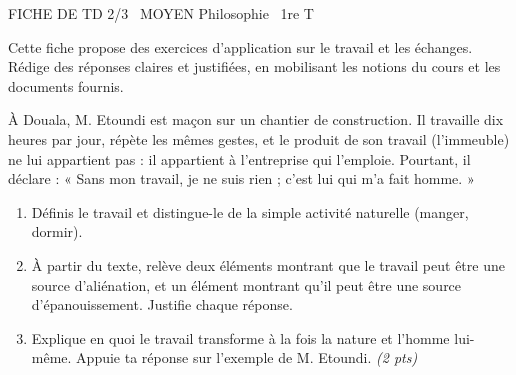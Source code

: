 \documentclass[11pt]{article}
\begin{document}
\begin{tcolorbox}[enhanced,colback=popink,colframe=popink,arc=10pt,boxrule=0pt,left=12pt,right=12pt,top=9pt,bottom=9pt]
{\color{white}\popxbold\small FICHE DE TD 2/3 \textbullet\ MOYEN \hfill Philosophie \textbullet\ 1re T\par}
\end{tcolorbox}
\vspace{4pt}
Cette fiche propose des exercices d'application sur le travail et les échanges. Rédige des réponses claires et justifiées, en mobilisant les notions du cours et les documents fournis.

\begin{exercice}
À Douala, M. Etoundi est maçon sur un chantier de construction. Il travaille dix heures par jour, répète les mêmes gestes, et le produit de son travail (l'immeuble) ne lui appartient pas : il appartient à l'entreprise qui l'emploie. Pourtant, il déclare : « Sans mon travail, je ne suis rien ; c'est lui qui m'a fait homme. »
\begin{enumerate}
\item Définis le travail et distingue-le de la simple activité naturelle (manger, dormir).
\item À partir du texte, relève deux éléments montrant que le travail peut être une source d'aliénation, et un élément montrant qu'il peut être une source d'épanouissement. Justifie chaque réponse.
\item Explique en quoi le travail transforme à la fois la nature et l'homme lui-même. Appuie ta réponse sur l'exemple de M. Etoundi. \textit{(2 pts)}
\end{enumerate}
\end{exercice}
\end{document}
